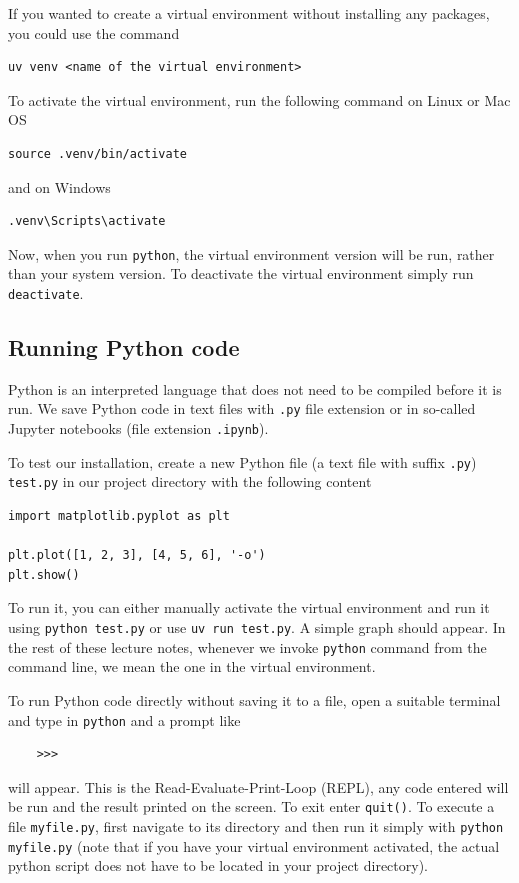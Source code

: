 If you wanted to create a virtual environment without installing any packages, you could use the command
\begin{lstlisting}
uv venv <name of the virtual environment>
\end{lstlisting}

To activate the virtual environment, run the following command on Linux or Mac OS
\begin{lstlisting}
source .venv/bin/activate
\end{lstlisting}
and on Windows
\begin{lstlisting}
.venv\Scripts\activate
\end{lstlisting}

Now, when you run \verb|python|, the virtual environment version will be run, rather than your system version. To deactivate the virtual environment simply run \verb|deactivate|.

\subsection{Running Python code}
Python is an interpreted language that does not need to be compiled before it is run. We save Python code in text files with \verb|.py| file extension or in so-called Jupyter notebooks (file extension \verb|.ipynb|).

To test our installation, create a new Python file (a text file with suffix \verb|.py|) \verb|test.py| in our project directory with the following content
\begin{lstlisting}
import matplotlib.pyplot as plt

plt.plot([1, 2, 3], [4, 5, 6], '-o')
plt.show()
\end{lstlisting}
To run it, you can either manually activate the virtual environment and run it using
\verb|python test.py| or use \verb|uv run test.py|. A simple graph should appear. In the rest of these lecture notes, whenever we invoke \verb|python| command from the command line, we mean the one in the virtual environment.

To run Python code directly without saving it to a file, open a suitable terminal and type in \verb|python| and a prompt like
\begin{lstlisting}
    >>>
\end{lstlisting}
will appear. This is the Read-Evaluate-Print-Loop (REPL), any code entered will be run and the result printed on the screen. To exit enter \verb|quit()|. To execute a file \verb|myfile.py|, first navigate to its directory and then run it simply with \verb|python myfile.py| (note that if you have your virtual environment activated, the actual python script does not have to be located in your project directory).


